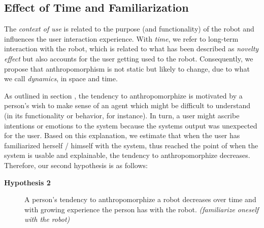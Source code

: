 \documentclass{acm_proc_article-sp}
\begin{document}
%
%
%
%
%


\subsection{Effect of Time and Familiarization}
\label{sec:8.2}

The \textit{context of use} is related to the purpose (and functionality) of
the robot and influences the user interaction experience. With \textit{time},
we refer to long-term interaction with the robot, which is related to what has
been described as \textit{novelty effect} but also accounts for the user
getting used to the robot. Consequently, we propose that anthropomorphism is
not static but likely to change, due to what we call \textit{dynamics}, in
space and time.


As outlined in section , the tendency to anthropomorphize is
motivated by a person's wish to make sense of an agent which might be difficult
to understand (in its functionality or behavior, for instance). In turn, a user
might ascribe intentions or emotions to the system because the systems output
was unexpected for the user. Based on this explanation, we estimate that when
the user has familiarized herself / himself with the system, thus reached the
point of when the system is usable and explainable, the tendency to
anthropomorphize decreases. Therefore, our second hypothesis is as follows: 

\begin{description}

    \item[\textbf{Hypothesis 2}] A person's tendency to anthropomorphize a
        robot decreases over time and with growing experience the person has
        with the robot. \textit{(familiarize oneself with the robot)}

\end{description}	
	
\end{document}
